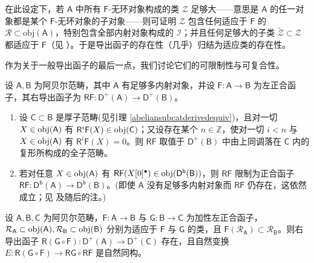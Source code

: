 在此设定下，若 $\mathsf{A}$ 中所有 $\mathsf{F}$-无环对象构成的类 $\mathcal{Z}$ 足够大——意思是 $\mathsf{A}$ 的任一对象都是某个 $\mathsf{F}$-无环对象的子对象——则可证明 $\mathcal{Z}$ 包含任何适应于 $\mathsf{F}$ 的 $\mathcal{R}\subset\text{obj}(\mathsf{A})$，特别包含全部内射对象构成的 $\mathcal{I}$；并且任何足够大的子类 $\tilde{\mathcal{Z}}\subset\mathcal{Z}$ 都适应于 $\mathsf{F}$（见 \cite[Theorem III.6.16]{[GM03]}）。于是导出函子的存在性（几乎）归结为适应类的存在性。
\vspace*{0.3cm}

\noindent 作为关于一般导出函子的最后一点，我们讨论它们的可限制性与可复合性。

\begin{Pro}\label{derivedfuncrestrictstobdd}
	设 $\mathsf{A},\mathsf{B}$ 为阿贝尔范畴，其中 $\mathsf{A}$ 有足够多内射对象，并设 $\mathsf{F}:\mathsf{A}\rightarrow\mathsf{B}$ 为左正合函子，其右导出函子为 $\mathsf{RF}:\mathsf{D^+(A)}\rightarrow\mathsf{D^+(B)}$。
	\renewcommand{\theenumi}{\roman{enumi}}
	\begin{enumerate}[leftmargin=0.5cm]
		\item 设 $\mathsf{C}\subset\mathsf{B}$ 是厚子范畴\textup(见引理 \ref{abeliansubcatderivedequiv}\textup)，且对一切 $X\in\textup{obj}(\mathsf{A})$ 有 $\mathsf{R}^i\mathsf{F}(X)\in\textup{obj}(\mathsf{C})$；又设存在某个 $n\in\mathbb{Z}$，使对一切 $i<n$ 与 $X\in\textup{obj}(\mathsf{A})$ 有 $\mathsf{R}^i\mathsf{F}(X)=0$。则 $\mathsf{RF}$ 取值于 $\mathsf{D^+(B)}$ 中由上同调落在 $\mathsf{C}$ 内的复形所构成的全子范畴。
		
		\item 若对任意 $X\in\textup{obj}(\mathsf{A})$ 有 $\mathsf{RF}(X[0]^\bullet)\in\textup{obj}(\mathsf{D^b(B)})$，则 $\mathsf{RF}$ 限制为正合函子 $\mathsf{RF}:\mathsf{D^b(A)}\rightarrow\mathsf{D^b(B)}$。\textup(即使 $\mathsf{A}$ 没有足够多内射对象而 $\mathsf{RF}$ 仍存在，这依然成立；见 \textup{\cite[Corollary 2.68]{[Huy06]}} 及随后的注。\textup) 
	\end{enumerate}
\end{Pro}

\begin{Pro}\label{derivedfunccompo}
	设 $\mathsf{A}, \mathsf{B}, \mathsf{C}$ 为阿贝尔范畴，$\mathsf{F}:\mathsf{A}\rightarrow\mathsf{B}$ 与 $\mathsf{G}:\mathsf{B}\rightarrow\mathsf{C}$ 为加性左正合函子，$\mathcal{R}_\mathsf{A}\subset\textup{obj}(\mathsf{A}), \mathcal{R}_\mathsf{B}\subset\textup{obj}(\mathsf{B})$ 分别为适应于 $\mathsf{F}$ 与 $\mathsf{G}$ 的类，且 $\mathsf{F}(\mathcal{R}_\mathsf{A})\subset\mathcal{R}_\mathsf{B}$。则右导出函子 $\mathsf{R(G\circ F)}:\mathsf{D^+(A)}\rightarrow\mathsf{D^+(C)}$ 存在，且自然变换 $E:\mathsf{R(G\circ F)}\rightarrow \mathsf{RG\circ RF}$ 是自然同构。
\end{Pro}

